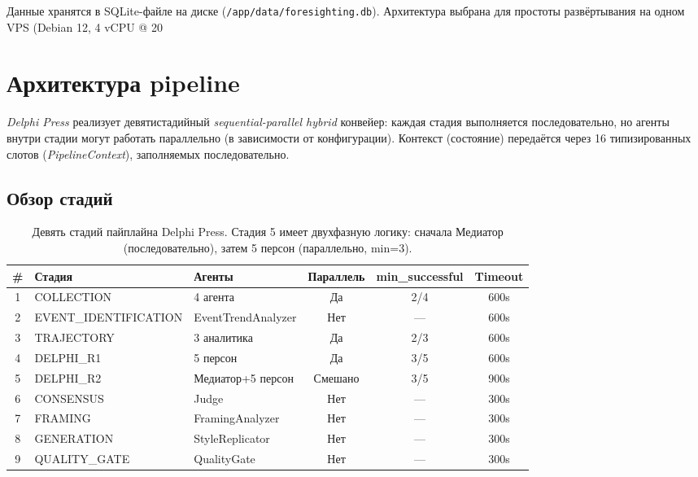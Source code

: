 \noindent Данные хранятся в SQLite-файле на диске (\texttt{/app/data/foresighting.db}). Архитектура выбрана для простоты развёртывания на одном VPS (Debian 12, 4 vCPU @ 20%


\section{Архитектура pipeline}

\label{sec:architecture}


\emph{Delphi Press} реализует девятистадийный \emph{sequential-parallel hybrid} конвейер: каждая стадия выполняется последовательно, но агенты внутри стадии могут работать параллельно (в зависимости от конфигурации). Контекст (состояние) передаётся через 16 типизированных слотов (\emph{PipelineContext}), заполняемых последовательно.

\subsection{Обзор стадий}


\begin{table}[h]
\centering
\small
\begin{tabular}{|c|l|l|c|c|c|}
\hline
\# & \textbf{Стадия} & \textbf{Агенты} & \textbf{Параллель} & \textbf{min\_successful} & \textbf{Timeout} \\
\hline
1 & COLLECTION & 4 агента & Да & 2/4 & 600s \\
2 & EVENT\_IDENTIFICATION & EventTrendAnalyzer & Нет & — & 600s \\
3 & TRAJECTORY & 3 аналитика & Да & 2/3 & 600s \\
4 & DELPHI\_R1 & 5 персон & Да & 3/5 & 600s \\
5 & DELPHI\_R2 & Медиатор+5 персон & Смешано & 3/5 & 900s \\
6 & CONSENSUS & Judge & Нет & — & 300s \\
7 & FRAMING & FramingAnalyzer & Нет & — & 300s \\
8 & GENERATION & StyleReplicator & Нет & — & 300s \\
9 & QUALITY\_GATE & QualityGate & Нет & — & 300s \\
\hline
\end{tabular}
\caption{Девять стадий пайплайна Delphi Press. Стадия 5 имеет двухфазную логику: сначала Медиатор (последовательно), затем 5 персон (параллельно, min=3).}
\label{tab:stages}
\end{table}

